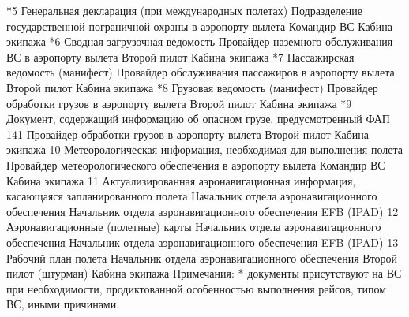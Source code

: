 *5	Генеральная декларация (при международных полетах)	Подразделение государственной пограничной охраны в аэропорту вылета	Командир ВС	Кабина экипажа
*6	Сводная загрузочная ведомость	Провайдер наземного обслуживания ВС в аэропорту вылета	Второй пилот	Кабина экипажа
*7	Пассажирская ведомость (манифест)	Провайдер обслуживания пассажиров в аэропорту вылета	Второй пилот	Кабина экипажа
*8	Грузовая ведомость (манифест)	Провайдер обработки грузов в аэропорту вылета	Второй пилот	Кабина экипажа
*9	Документ, содержащий информацию об опасном грузе, предусмотренный ФАП 141	Провайдер обработки грузов в аэропорту вылета	Второй пилот	Кабина экипажа
10	Метеорологическая информация, необходимая для выполнения полета	Провайдер метеорологического обеспечения в аэропорту вылета	Командир ВС	Кабина экипажа
11	Актуализированная аэронавигационная информация, касающаяся запланированного полета	Начальник отдела аэронавигационного обеспечения	Начальник отдела аэронавигационного обеспечения	EFB (IPAD)
12	Аэронавигационные (полетные) карты	Начальник отдела аэронавигационного обеспечения	Начальник отдела аэронавигационного обеспечения	EFB (IPAD)
13	Рабочий план полета	Начальник отдела аэронавигационного обеспечения	Второй пилот (штурман)	Кабина экипажа
Примечания:
*	документы присутствуют на ВС при необходимости, продиктованной особенностью выполнения рейсов, типом ВС, иными причинами.



